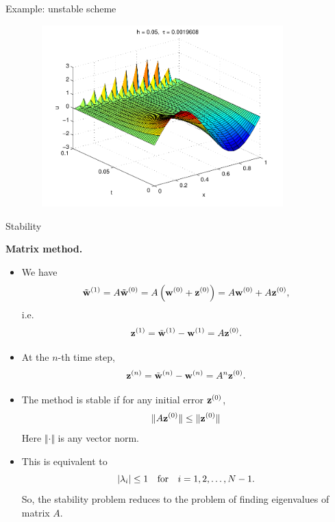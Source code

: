 \documentclass{beamer}
\begin{document}


\begin{frame}{Example: unstable scheme}
\begin{figure}[h]
\centering
\includegraphics[width=10cm,height=7cm]{../Lecture_notes/forward_diff_fig2.pdf}
\end{figure}


\end{frame}

\begin{frame}{Stability}

{\small

\textbf{Matrix method.}

\begin{itemize}[<+->]

\item We have
\[
\tilde{\bf w}^{(1)}=A\tilde{\bf w}^{(0)}=A\left({\bf w}^{(0)}+{\bf z}^{(0)}\right)=A{\bf w}^{(0)}+A{\bf z}^{(0)},
\]
i.e.
\[
{\bf z}^{(1)}=\tilde{\bf w}^{(1)}-{\bf w}^{(1)}=A{\bf z}^{(0)}.
\]
\item At the $n$-th time step,
\[
{\bf z}^{(n)}=\tilde{\bf w}^{(n)}-{\bf w}^{(n)}=A^n{\bf z}^{(0)}.
\]
\item The method is stable if
for any initial error ${\bf z}^{(0)}$,
\[
\Vert A{\bf z}^{(0)}\Vert\leq \Vert {\bf z}^{(0)}\Vert
\]
Here $\Vert\cdot\Vert$ is any vector norm.

\item This is
equivalent to
\[
\vert\lambda_{i}\vert\leq 1 \quad \hbox{for} \quad i=1, 2, \dots, N-1.
\]
So, the stability problem reduces to the problem of finding eigenvalues of matrix $A$.

\end{itemize}
}

\end{frame}
\end{document}
